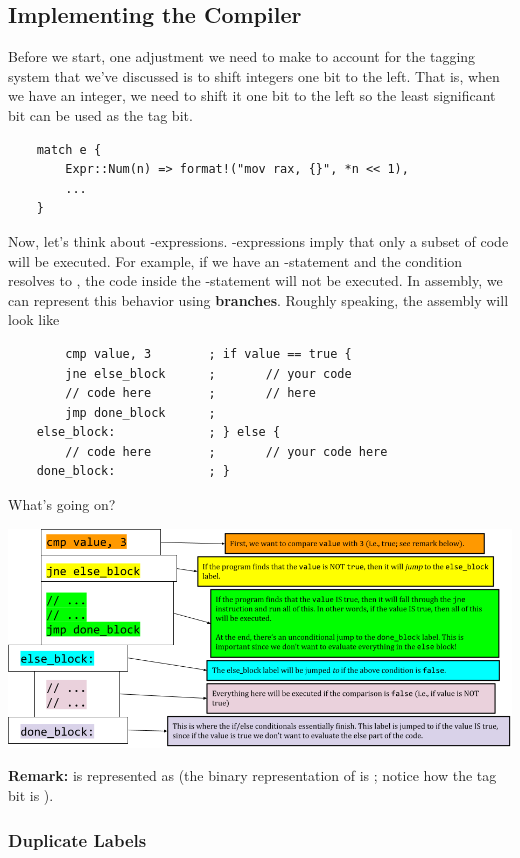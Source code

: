 \subsection{Implementing the Compiler}
Before we start, one adjustment we need to make to account for the tagging system that we've discussed is to shift integers one bit to the left. That is, when we have an integer, we need to shift it one bit to the left so the least significant bit can be used as the tag bit.
\begin{verbatim}
    match e {
        Expr::Num(n) => format!("mov rax, {}", *n << 1),
        ... 
    }\end{verbatim}
Now, let's think about -expressions. -expressions imply that only a subset of code will be executed. For example, if we have an -statement and the condition resolves to , the code inside the -statement will not be executed. In assembly, we can represent this behavior using \textbf{branches}. Roughly speaking, the assembly will look like
\begin{verbatim}
        cmp value, 3        ; if value == true {
        jne else_block      ;       // your code
        // code here        ;       // here 
        jmp done_block      ; 
    else_block:             ; } else {
        // code here        ;       // your code here
    done_block:             ; }
\end{verbatim}
What's going on?  
\begin{center}
    \includegraphics[scale=0.5]{assets/asm_if.png}
\end{center}
\textbf{Remark:}  is represented as  (the binary representation of  is ; notice how the tag bit is ).

\subsubsection{Duplicate Labels}

